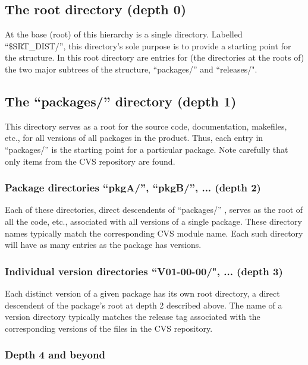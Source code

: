 \subsection{The root directory (depth 0)}

    At the base (root) of this hierarchy is a single directory. Labelled 
``\$SRT\_DIST/'', this directory's sole purpose is to provide a starting point for 
the structure. In this root directory are entries for (the directories at the 
roots of) the two major subtrees of the structure, ``packages/''
 and ``releases/". 

\subsection{The ``packages/'' directory (depth 1)}

    This directory serves as a root for the source code, documentation, 
makefiles, etc., for all versions of all packages in the product. Thus, each 
entry in ``packages/'' is the starting point for a particular package. Note 
carefully that only items from the CVS repository are found. 

\subsubsection{Package directories ``pkgA/'', ``pkgB/'', ... (depth 2)}

    Each of these directories, direct descendents of ``packages/''
 , serves as the
root of all the code, etc., associated with all versions of a single package. 
These directory names typically match the corresponding CVS module name. Each 
such directory will have as many entries as the package has versions. 

\subsubsection{Individual version directories ``V01-00-00/", ... (depth 3)}
\label{sec_version}

    Each distinct version of a given package has its own root directory, a 
direct descendent of the package's root at depth 2 described above. The name 
of a version directory typically matches the release tag associated with the 
corresponding versions of the files in the CVS repository. 

\subsubsection{Depth 4 and beyond}
\label{sec_depth4}

